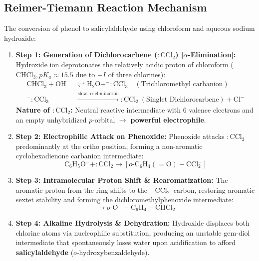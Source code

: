 \documentclass[10pt,twoside,openright]{book}
\begin{document}
\subsection{Reimer-Tiemann Reaction Mechanism}

\begin{conceptbox}
The conversion of phenol to salicylaldehyde using chloroform and aqueous sodium hydroxide:
\begin{enumerate}[leftmargin=*]
  \item \textbf{Step 1: Generation of Dichlorocarbene ($:\mathrm{CCl_2}$) [$\alpha$-Elimination]:}
  Hydroxide ion deprotonates the relatively acidic proton of chloroform ($\mathrm{CHCl_3}, pK_a \approx 15.5$ due to $-I$ of three chlorines):
  \begin{align*}
    \mathrm{CHCl_3} + \mathrm{OH^-} &\rightleftharpoons \mathrm{H_2O} + ^-:\mathrm{CCl_3} \quad (\text{Trichloromethyl carbanion})\\
    ^-:\mathrm{CCl_3} &\xrightarrow{\text{slow, }\alpha\text{-elimination}} \mathbf{:\mathrm{CCl_2}} \ (\text{Singlet Dichlorocarbene}) + \mathrm{Cl^-}
  \end{align*}
  \textbf{Nature of $:\mathrm{CCl_2}$:} Neutral reactive intermediate with 6 valence electrons and an empty unhybridized $p$-orbital $\to$ \textbf{powerful electrophile}.
  \item \textbf{Step 2: Electrophilic Attack on Phenoxide:}
  Phenoxide attacks $:\mathrm{CCl_2}$ predominantly at the ortho position, forming a non-aromatic cyclohexadienone carbanion intermediate:
  \begin{equation}
    \mathrm{C_6H_5O^-} + :\mathrm{CCl_2} \to [o\text{-}\mathrm{C_6H_4(=O)-CCl_2^-}]
  \end{equation}
  \item \textbf{Step 3: Intramolecular Proton Shift \& Rearomatization:}
  The aromatic proton from the ring shifts to the $-\mathrm{CCl_2^-}$ carbon, restoring aromatic sextet stability and forming the dichloromethylphenoxide intermediate:
  \begin{equation}
    [o\text{-}\mathrm{C_6H_4(=O)-CCl_2^-}] \to o\text{-}\mathrm{O^--C_6H_4-CHCl_2}
  \end{equation}
  \item \textbf{Step 4: Alkaline Hydrolysis \& Dehydration:}
  Hydroxide displaces both chlorine atoms via nucleophilic substitution, producing an unstable gem-diol intermediate that spontaneously loses water upon acidification to afford \textbf{salicylaldehyde} ($o$-hydroxybenzaldehyde).
\end{enumerate}
\end{conceptbox}
\end{document}
